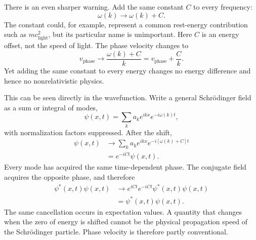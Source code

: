 There is an even sharper warning. Add the same constant \(C\) to every frequency:
\begin{equation}
\omega(k)\longrightarrow \omega(k)+C.
\end{equation}
The constant could, for example, represent a common rest-energy contribution such as \(mc_{\mathrm{light}}^2\), but its particular name is unimportant. Here \(C\) is an energy offset, not the speed of light. The phase velocity changes to
\begin{equation}
v_{\mathrm{phase}}\longrightarrow
\frac{\omega(k)+C}{k}
=v_{\mathrm{phase}}+\frac{C}{k}.
\end{equation}
Yet adding the same constant to every energy changes no energy difference and hence no nonrelativistic physics.

This can be seen directly in the wavefunction. Write a general Schr\"odinger field as a sum or integral of modes,
\begin{equation}
\psi(x,t)=\sum_k a_k e^{ikx}e^{-i\omega(k)t},
\end{equation}
with normalization factors suppressed. After the shift,
\begin{align}
\psi(x,t)
&\longrightarrow
\sum_k a_k e^{ikx}e^{-i[\omega(k)+C]t}
\\
&=e^{-iCt}\psi(x,t).
\end{align}
Every mode has acquired the same time-dependent phase. The conjugate field acquires the opposite phase, and therefore
\begin{equation}
\begin{aligned}
\psi^*(x,t)\psi(x,t)
&\longrightarrow
e^{iCt}e^{-iCt}\psi^*(x,t)\psi(x,t)
\\
&=\psi^*(x,t)\psi(x,t).
\end{aligned}
\end{equation}
The same cancellation occurs in expectation values. A quantity that changes when the zero of energy is shifted cannot be the physical propagation speed of the Schr\"odinger particle. Phase velocity is therefore partly conventional.

